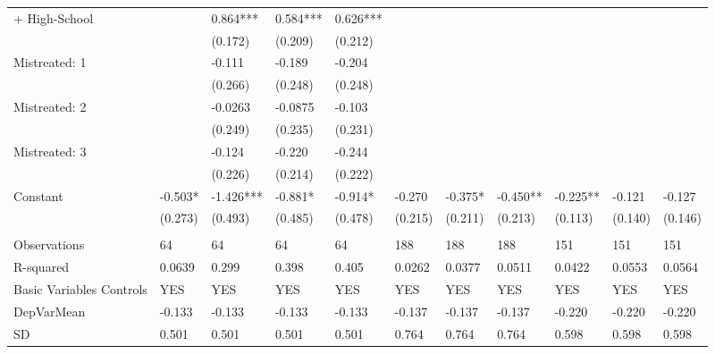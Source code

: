 \begin{tabular}{lllllllllll}
+ High-School &       & 0.864*** & 0.584*** & 0.626*** &       &       &       &       &       &  \\
      &       & (0.172) & (0.209) & (0.212) &       &       &       &       &       &  \\
Mistreated: 1 &       & -0.111 & -0.189 & -0.204 &       &       &       &       &       &  \\
      &       & (0.266) & (0.248) & (0.248) &       &       &       &       &       &  \\
Mistreated: 2 &       & -0.0263 & -0.0875 & -0.103 &       &       &       &       &       &  \\
      &       & (0.249) & (0.235) & (0.231) &       &       &       &       &       &  \\
Mistreated: 3 &       & -0.124 & -0.220 & -0.244 &       &       &       &       &       &  \\
      &       & (0.226) & (0.214) & (0.222) &       &       &       &       &       &  \\
Constant & -0.503* & -1.426*** & -0.881* & -0.914* & -0.270 & -0.375* & -0.450** & -0.225** & -0.121 & -0.127 \\
      & (0.273) & (0.493) & (0.485) & (0.478) & (0.215) & (0.211) & (0.213) & (0.113) & (0.140) & (0.146) \\
      &       &       &       &       &       &       &       &       &       &  \\
\midrule
Observations & 64    & 64    & 64    & 64    & 188   & 188   & 188   & 151   & 151   & 151 \\
R-squared & 0.0639 & 0.299 & 0.398 & 0.405 & 0.0262 & 0.0377 & 0.0511 & 0.0422 & 0.0553 & 0.0564 \\
Basic Variables Controls & YES   & YES   & YES   & YES   & YES   & YES   & YES   & YES   & YES   & YES \\
DepVarMean & -0.133 & -0.133 & -0.133 & -0.133 & -0.137 & -0.137 & -0.137 & -0.220 & -0.220 & -0.220 \\
SD    & 0.501 & 0.501 & 0.501 & 0.501 & 0.764 & 0.764 & 0.764 & 0.598 & 0.598 & 0.598 \\
\bottomrule
\bottomrule
\end{tabular}%

